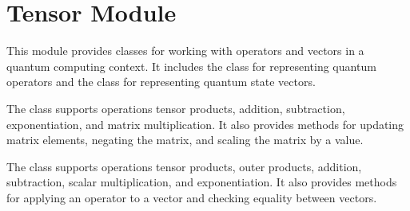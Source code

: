 \documentclass[letterpaper,10pt,english]{sphinxmanual}
\begin{document}

\chapter{Tensor Module}
\label{\detokenize{index:tensor-module}}\label{\detokenize{index:module-utils.tensor}}
\sphinxAtStartPar
This module provides classes for working with operators and vectors in a quantum computing context.
It includes the  class for representing quantum operators and the  class for
representing quantum state vectors.

\sphinxAtStartPar
The  class supports operations tensor products, addition, subtraction,
exponentiation, and matrix multiplication. It also provides methods for updating matrix elements,
negating the matrix, and scaling the matrix by a value.

\sphinxAtStartPar
The  class supports operations tensor products, outer products, addition, subtraction,
scalar multiplication, and exponentiation. It also provides methods for applying an operator to a
vector and checking equality between vectors.
\end{document}
